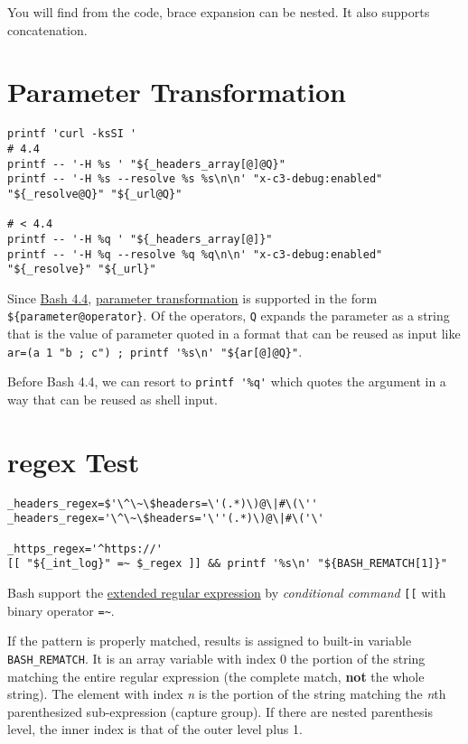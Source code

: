 You will find from the code, brace expansion can be nested. It
also supports concatenation.

\section{Parameter Transformation}
\label{sec:bash-param-transf}

\begin{lstlisting}
printf 'curl -ksSI '
# 4.4
printf -- '-H %s ' "${_headers_array[@]@Q}"
printf -- '-H %s --resolve %s %s\n\n' "x-c3-debug:enabled" "${_resolve@Q}" "${_url@Q}"

# < 4.4
printf -- '-H %q ' "${_headers_array[@]}"
printf -- '-H %q --resolve %q %q\n\n' "x-c3-debug:enabled" "${_resolve}" "${_url}"
\end{lstlisting}

Since \href{http://mywiki.wooledge.org/BashFAQ/061}{Bash 4.4},
\uline{parameter transformation} is supported in the form
\lstinline|${parameter@operator}|. Of the operators, \verb|Q|
expands the parameter as a string that is the value of parameter
quoted in a format that can be reused as input like
\lstinline|ar=(a 1 "b ; c") ; printf '%s\n' "${ar[@]@Q}"|.

Before Bash 4.4, we can resort to \lstinline|printf '%q'| which
quotes the argument in a way that can be reused as shell input.

\section{regex Test}
\label{sec:bash-regex-test}

\begin{lstlisting}
_headers_regex=$'\^\~\$headers=\'(.*)\)@\|#\(\''
_headers_regex='\^\~\$headers='\''(.*)\)@\|#\('\'

_https_regex='^https://'
[[ "${_int_log}" =~ $_regex ]] && printf '%s\n' "${BASH_REMATCH[1]}"
\end{lstlisting}

Bash support the
\href{http://mywiki.wooledge.org/RegularExpression}{extended
  regular expression} by \textit{conditional command} \verb|[[|
with binary operator \verb|=~|.

If the pattern is properly matched, results is assigned to
built-in variable \lstinline|BASH_REMATCH|. It is an array
variable with index 0 the portion of the string matching the
entire regular expression (the complete match, \textbf{not} the
whole string). The element with index \textit{n} is the portion of
the string matching the \textit{n}th parenthesized sub-expression
(capture group). If there are nested parenthesis level, the inner
index is that of the outer level plus 1.

